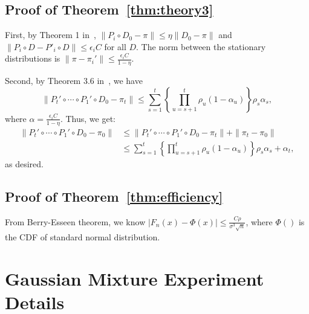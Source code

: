 \documentclass{article}
\begin{document}
\subsection{Proof of Theorem~\ref{thm:theory3}}\label{app:theory3}

First, by Theorem 1 in~\cite{cutting_mh_2014}, $\|P_i \circ D_0 - \pi\| \leq \eta \|D_0
- \pi\|$ and $\|P_i\circ D-P'_i\circ D\| \leq \epsilon_i C$ for all $D$. The norm between the
stationary distributions is $\|\pi - \pi_i'\|\leq \frac{\epsilon_i C}{1-\eta}$.

Second, by Theorem 3.6 in~\cite{yang2013sequential}, we have 
\[
\| P_t' \circ \cdots \circ P_1' \circ D_0 - \pi_t \| \leq \sum_{s=1}^t \left\{\prod _{u=s+1}^t
\rho_u (1-\alpha_u)\right\} \rho_s \alpha_s,
\]
where $\alpha = \frac{\epsilon_i C}{1-\eta}$.  Thus, we get:
\begin{align*}
 \| P_t' \circ \cdots \circ P_1' \circ D_0 - \pi_0 \| &\leq \|P_t' \circ \cdots \circ P_1' \circ D_0 - \pi_t\| + \|\pi_t - \pi_0\| \\
 &\leq \sum_{s=1}^t \left\{\prod _{u=s+1}^t \rho_u (1-\alpha_u)\right\} \rho_s \alpha_s + \alpha_t,
\end{align*}
as desired.

\subsection{Proof of Theorem~\ref{thm:efficiency}}\label{app:theory4}
From Berry-Esseen theorem, we know $|F_n(x) - \Phi(x)| \leq \frac{C\rho}{\sigma^3\sqrt{n}}$, where $\Phi()$ is the CDF of standard normal distribution. 



\section{Gaussian Mixture Experiment Details}\label{app:gaussian}
\end{document}
